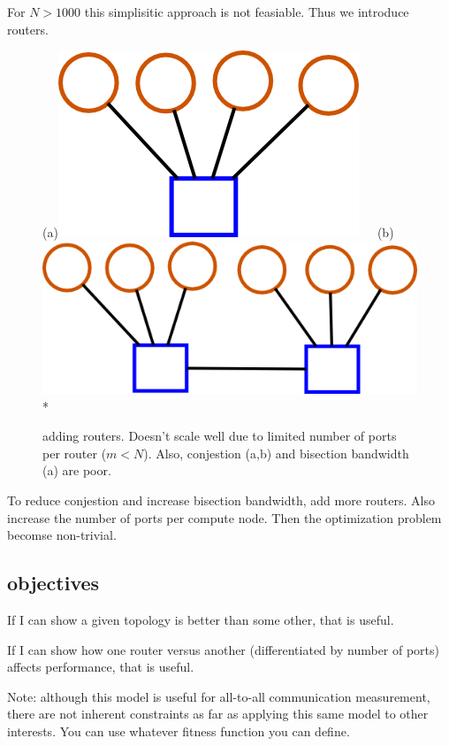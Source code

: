 \documentclass[pdftex]{article}
\begin{document}
For $N>1000$ this simplisitic approach is not feasiable. Thus we introduce routers.
\begin{figure}[h!]
\begin{center}
(a)\includegraphics[scale=0.2]{pictures/N4_n1_M1_m4}\ \ \ 
(b)\includegraphics[scale=0.2]{pictures/N6_n1_M2_m4}\\*
\caption{adding routers. Doesn't scale well due to limited number of ports per router ($m<N$). Also, conjestion (a,b) and bisection bandwidth (a) are poor.}
\end{center}
\end{figure}

To reduce conjestion and increase bisection bandwidth, add more routers. Also increase the number of ports per compute node. Then the optimization problem becomse non-trivial.

\subsection{objectives}

If I can show a given topology is better than some other, that is useful.

If I can show how one router versus another (differentiated by number of ports) affects performance, that is useful.

Note: although this model is useful for all-to-all communication measurement, there are not inherent constraints as far as applying this same model to other interests. You can use whatever fitness function you can define.
\end{document}
